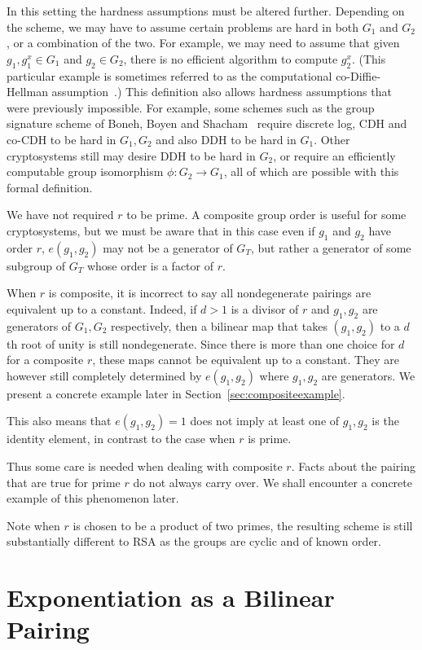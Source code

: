In this setting the hardness assumptions must be altered further.
Depending on the scheme, we may have to assume certain problems are hard in
both $G_1$ and $G_2$, or a combination of the two. For example, we may
need to assume that given $g_1, g_1^x \in G_1$ and $g_2 \in G_2$,
there is no efficient algorithm to compute $g_2^x$. (This particular
example is sometimes referred to as
the computational co-Diffie-Hellman assumption~\cite{bls}.)
This definition also allows hardness assumptions that were previously
impossible. For example, some schemes such as the group signature scheme
of Boneh, Boyen and Shacham~\cite{bbs} require discrete log, CDH and
co-CDH to be hard in $G_1, G_2$ and also DDH to be hard in $G_1$.
Other cryptosystems still may
desire DDH to be hard in $G_2$, or require an efficiently computable
group isomorphism $\phi:G_2 \rightarrow G_1$, all of which are possible
with this formal definition.

We have not required $r$ to be prime. A composite group
order is useful for some cryptosystems\cite{bgn},
but we must be aware that in this case even if $g_1$ and $g_2$ have order
$r$, $e(g_1, g_2)$ may not be a generator of $G_T$, but rather a generator
of some subgroup of $G_T$ whose order is a factor of $r$.

When $r$ is composite, it is incorrect to say all nondegenerate pairings are
equivalent up to a constant. Indeed, if $d > 1$ is a divisor of $r$
and $g_1, g_2$ are generators of $G_1, G_2$ respectively, then a bilinear map
that takes $(g_1, g_2)$ to a $d$th root of unity is still nondegenerate.
Since there is more than one choice for $d$ for a composite $r$,
these maps cannot be equivalent up to a constant. They are however still
completely determined by $e(g_1, g_2)$ where $g_1, g_2$ are generators.
We present a concrete example later in Section~\ref{sec:compositeexample}.

This also means that $e(g_1, g_2) = 1$ does not imply at least
one of $g_1, g_2$ is the identity element, in contrast to the case when
$r$ is prime.

Thus some care is needed when dealing with composite $r$.
Facts about the pairing that are true for prime $r$ do not always carry over.
We shall encounter a concrete example of this phenomenon later.

Note when $r$ is chosen to be a product of two primes, the resulting scheme
is still substantially different to RSA as the groups are cyclic and of
known order.

\section{Exponentiation as a Bilinear Pairing}

